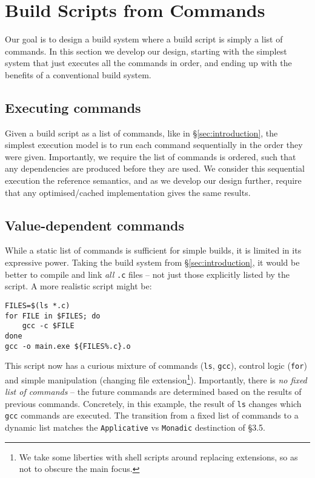 \section{Build Scripts from Commands}
\label{sec:design}

Our goal is to design a build system where a build script is simply a list of commands. In this section we develop our design, starting with the simplest system that just executes all the commands in order, and ending up with the benefits of a conventional build system.

\subsection{Executing commands}
\label{sec:executing_commands}

Given a build script as a list of commands, like in \S\ref{sec:introduction}, the simplest execution model is to run each command sequentially in the order they were given. Importantly, we require the list of commands is ordered, such that any dependencies are produced before they are used. We consider this sequential execution the reference semantics, and as we develop our design further, require that any optimised/cached implementation gives the same results.

\subsection{Value-dependent commands}
\label{sec:monadic}

While a static list of commands is sufficient for simple builds, it is limited in its expressive power. Taking the build system from \S\ref{sec:introduction}, it would be better to compile and link \emph{all} \texttt{.c} files -- not just those explicitly listed by the script. A more realistic script might be:

\vspace{3mm}
\begin{verbatim}
FILES=$(ls *.c)
for FILE in $FILES; do
    gcc -c $FILE
done
gcc -o main.exe ${FILES%.c}.o
\end{verbatim}
\vspace{3mm}

This script now has a curious mixture of commands (\texttt{ls}, \texttt{gcc}), control logic (\texttt{for}) and simple manipulation (changing file extension\footnote{We take some liberties with shell scripts around replacing extensions, so as not to obscure the main focus.}). Importantly, there is \emph{no fixed list of commands} -- the future commands are determined based on the results of previous commands. Concretely, in this example, the result of \texttt{ls} changes which \texttt{gcc} commands are executed. The transition from a fixed list of commands to a dynamic list matches the \texttt{Applicative} vs \texttt{Monadic} destinction of \citet{build_systems_a_la_carte} \S3.5.

